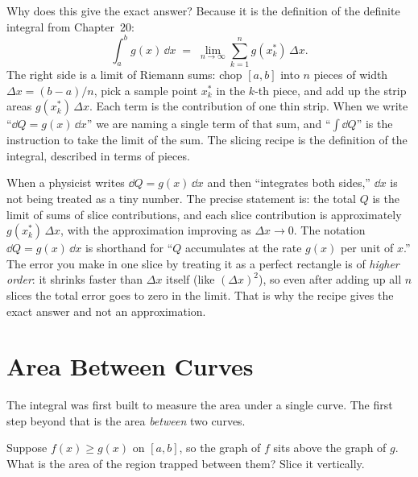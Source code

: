 Why does this give the exact answer? Because it is the definition of the definite
integral from Chapter~20:
\[
  \int_a^b g(x)\,\dd x \;=\; \lim_{n\to\infty}\sum_{k=1}^n g(x_k^*)\,\Delta x.
\]
The right side is a limit of Riemann sums: chop $[a,b]$ into $n$ pieces of width
$\Delta x = (b-a)/n$, pick a sample point $x_k^*$ in the $k$-th piece, and add up
the strip areas $g(x_k^*)\,\Delta x$. Each term is the contribution of one thin
strip. When we write ``$\dd Q = g(x)\,\dd x$'' we are naming a single term of that
sum, and ``$\int \dd Q$'' is the instruction to take the limit of the sum. The
slicing recipe is the definition of the integral, described in terms of pieces.

\begin{happeningbox}
When a physicist writes $\dd Q = g(x)\,\dd x$ and then ``integrates both sides,''
$\dd x$ is not being treated as a tiny number. The precise statement is: the total
$Q$ is the limit of sums of slice contributions, and each slice contribution is
approximately $g(x_k^*)\,\Delta x$, with the approximation improving as
$\Delta x \to 0$. The notation $\dd Q = g(x)\,\dd x$ is shorthand for ``$Q$
accumulates at the rate $g(x)$ per unit of $x$.'' The error you make in one slice
by treating it as a perfect rectangle is of \emph{higher order}: it shrinks faster
than $\Delta x$ itself (like $(\Delta x)^2$), so even after adding up all $n$ slices
the total error goes to zero in the limit. That is why the recipe gives the exact
answer and not an approximation.
\end{happeningbox}

\section{Area Between Curves}
\label{ch26:area}

The integral was first built to measure the area under a single curve. The first
step beyond that is the area \emph{between} two curves.

Suppose $f(x) \ge g(x)$ on $[a,b]$, so the graph of $f$ sits above the graph of
$g$. What is the area of the region trapped between them? Slice it vertically.

